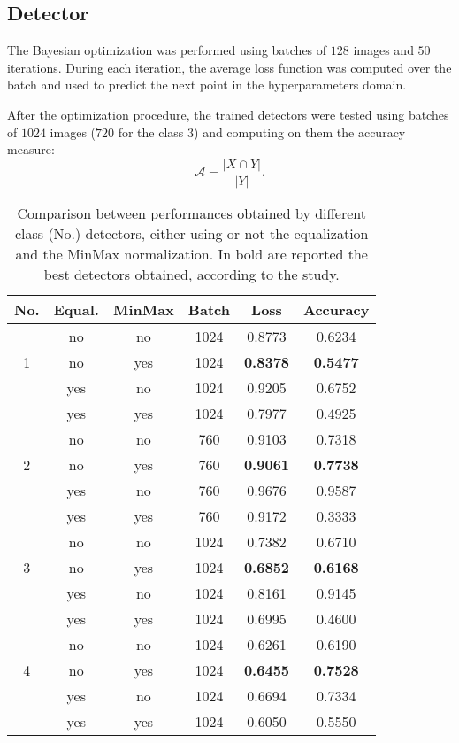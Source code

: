 \subsection{Detector}\label{section:results:detector}
\par{
	The Bayesian optimization was performed using batches of $128$ images and $50$ iterations. During each iteration, the average loss function was computed over the batch and used to predict the next point in the hyperparameters domain. 
}
\par{
	After the optimization procedure, the trained detectors were tested using batches of $1024$ images ($720$ for the class $3$) and computing on them the accuracy measure:
	\begin{equation*}
	\mathcal{A} = \frac{\lvert X \cap Y \rvert}{\lvert Y \rvert}.
	\end{equation*}
}
\begin{table}
	\centering
	\normalsize	
	\begin{tabular}{|c|c|c|c|c|c|}
		\hline		
		\textbf{No.} & \textbf{Equal.} & \textbf{MinMax} & \textbf{Batch} & \textbf{Loss} & \textbf{Accuracy}\\ \hline
		\multirow{3}{*}{1} & no & no & 1024 & 0.8773 & 0.6234 \\
		& no & yes & 1024 & \textbf{0.8378} & \textbf{0.5477} \\
		& yes & no & 1024 & 0.9205 & 0.6752 \\
		& yes & yes & 1024 & 0.7977 & 0.4925 \\ \hline
		\multirow{3}{*}{2} & no & no & 760 & 0.9103 & 0.7318\\
		& no & yes & 760 & \textbf{0.9061} & \textbf{0.7738} \\
		& yes & no & 760 & 0.9676 & 0.9587 \\
		& yes & yes & 760 & 0.9172 & 0.3333 \\ \hline
		\multirow{3}{*}{3} & no & no & 1024 & 0.7382 & 0.6710 \\
		& no & yes & 1024 & \textbf{0.6852} & \textbf{0.6168} \\
		& yes & no & 1024 & 0.8161 & 0.9145 \\
		& yes & yes & 1024 & 0.6995 & 0.4600 \\ \hline
		\multirow{3}{*}{4} & no & no & 1024 & 0.6261 & 0.6190 \\
		& no & yes & 1024 & \textbf{0.6455} & \textbf{0.7528} \\
		& yes & no & 1024 & 0.6694 & 0.7334 \\
		& yes & yes & 1024 & 0.6050 & 0.5550 \\ \hline
	\end{tabular}
	\vspace{0.25cm}
	\caption{Comparison between performances obtained by different class (No.) detectors, either using or not the equalization and the MinMax normalization. In bold are reported the best detectors obtained, according to the study.}\label{table:test-bayesopt}
\end{table}
